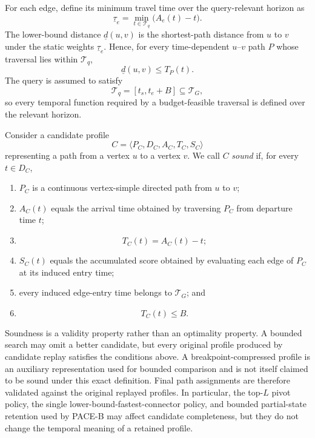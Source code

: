 \documentclass[a4paper,fleqn]{cas-dc}
\begin{document}
For each edge, define its minimum travel time over the query-relevant horizon
as
\[
\underline{\tau}_e
=
\min_{t\in\mathcal{T}_q}
\bigl(A_e(t)-t\bigr).
\]
The lower-bound distance \(\underline d(u,v)\) is the shortest-path distance
from \(u\) to \(v\) under the static weights \(\underline{\tau}_e\). Hence,
for every time-dependent \(u\)--\(v\) path \(P\) whose traversal lies within
\(\mathcal{T}_q\),
\[
\underline d(u,v)
\leq
T_P(t).
\]
The query is assumed to satisfy
\[
\mathcal{T}_q=[t_s,t_e+B]
\subseteq
\mathcal{T}_G,
\]
so every temporal function required by a budget-feasible traversal is defined
over the relevant horizon.

Consider a candidate profile
\[
C=
\langle
P_C,D_C,A_C,T_C,S_C
\rangle
\]
representing a path from a vertex \(u\) to a vertex \(v\). We call \(C\)
\emph{sound} if, for every \(t\in D_C\),

\begin{enumerate}
    \item \(P_C\) is a continuous vertex-simple directed path from \(u\) to
    \(v\);

    \item \(A_C(t)\) equals the arrival time obtained by traversing \(P_C\)
    from departure time \(t\);

    \item
    \[
    T_C(t)=A_C(t)-t;
    \]

    \item \(S_C(t)\) equals the accumulated score obtained by evaluating each
    edge of \(P_C\) at its induced entry time;

    \item every induced edge-entry time belongs to \(\mathcal{T}_G\); and

    \item
    \[
    T_C(t)\leq B.
    \]
\end{enumerate}

Soundness is a validity property rather than an optimality property. A bounded
search may omit a better candidate, but every original profile produced by
candidate replay satisfies the conditions above. A breakpoint-compressed
profile is an auxiliary representation used for bounded comparison and is not
itself claimed to be sound under this exact definition. Final path assignments
are therefore validated against the original replayed profiles. In particular,
the top-\(L\) pivot policy, the single lower-bound-fastest-connector policy, and bounded
partial-state retention used by PACE-B may affect candidate completeness, but
they do not change the temporal meaning of a retained profile.
\end{document}
